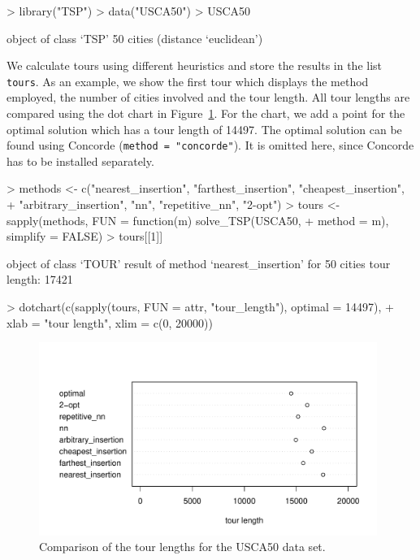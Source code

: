 \documentclass[10pt,a4paper,fleqn]{article}
\newcommand{\code}[1]{\mbox{\texttt{#1}}}
\begin{document}
\begin{Schunk}
\begin{Sinput}
> library("TSP")
> data("USCA50")
> USCA50
\end{Sinput}
\begin{Soutput}
object of class ‘TSP’ 
50 cities (distance ‘euclidean’) 
\end{Soutput}
\end{Schunk}


We calculate tours using different heuristics and store the results in
the list \code{tours}. As an example, we show the first tour which
displays the method employed, the number of cities involved and the tour
length.  All tour lengths are compared using the dot chart in
Figure~\ref{fig:dotchart}.  For the chart, we add a point for the
optimal solution which has a tour length of 14497. The optimal solution
can be found using Concorde (\code{method = "concorde"}).  It is omitted
here, since Concorde has to be installed separately.



\begin{Schunk}
\begin{Sinput}
> methods <- c("nearest_insertion", "farthest_insertion", "cheapest_insertion", 
+     "arbitrary_insertion", "nn", "repetitive_nn", "2-opt")
> tours <- sapply(methods, FUN = function(m) solve_TSP(USCA50, 
+     method = m), simplify = FALSE)
> tours[[1]]
\end{Sinput}
\begin{Soutput}
object of class ‘TOUR’ 
result of method ‘nearest_insertion’ for 50 cities
tour length: 17421 
\end{Soutput}
\begin{Sinput}
> dotchart(c(sapply(tours, FUN = attr, "tour_length"), optimal = 14497), 
+     xlab = "tour length", xlim = c(0, 20000))
\end{Sinput}
\end{Schunk}

\begin{figure}
\centering
\includegraphics[width=11cm, trim=0 10 0 0]{TSP-dotchart_USCA50}
\caption{Comparison of the tour lengths for the USCA50 data set.}
\label{fig:dotchart}
\end{figure}
\end{document}
